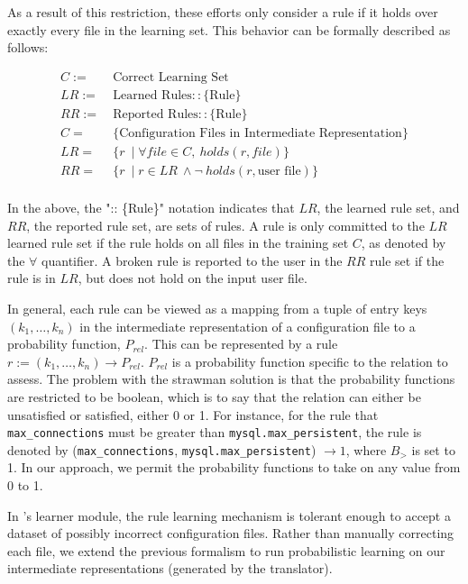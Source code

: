 As a result of this restriction, 
these efforts only consider a rule if it holds over exactly every file in 
the learning set. This behavior can be formally described as follows:
\begin{small}
\begin{align*}
C :=&\ \text{Correct Learning Set}\\
LR :=&\ \text{Learned Rules} :: \{\textrm{Rule}\}\\
RR :=&\ \text{Reported Rules} :: \{\textrm{Rule}\}\\ 
C =&\ \text{\{Configuration Files in Intermediate Representation\}}\\
LR =&\ \{ r\ \mid \forall file \in C,\ holds(r,file)\} \\
RR =&\ \{ r\ \mid r \in LR \ \land \neg\ holds(r,\textrm{user file}) \}\\
\end{align*}
\end{small}
In the above, the ":: \{Rule\}" notation indicates that $LR$, the learned rule set, 
and $RR$, the reported rule set, are sets of rules.
A rule is only committed to the $LR$ learned rule set if 
the rule holds on all files in the training set $C$, as denoted by the $\forall$ quantifier. 
A broken rule is reported to the user in the $RR$ rule set if the rule is in $LR$, 
but does not hold on the input user file.

In general, each rule can be viewed as a mapping from a tuple of 
entry keys $(k_1, \ldots, k_n)$ in the intermediate representation of a 
configuration file to a probability function, $P_{rel}$. This can be represented by a rule
$r := (k_1, \ldots, k_n) \rightarrow P_{rel}$.
$P_{rel}$ is a probability function specific to the relation to assess.
The problem with the strawman solution is that the probability functions are restricted to be 
boolean, which is to say that the relation can either be unsatisfied or satisfied, either 0 or 1. 
For instance, for the rule that {\tt max\_connections} must 
be greater than {\tt mysql.max\_persistent}, the rule is denoted by
({\tt max\_connections}, {\tt mysql.max\_persistent}) $\to 1$, where 
$B_{>}$ is set to 1. In our approach, we permit the probability functions to take on any value from 0 to 1.

In \app's learner module, the rule learning mechanism is tolerant 
enough to accept a dataset of possibly incorrect configuration files. 
Rather than manually correcting each file, 
we extend the previous formalism to run probabilistic learning
on our intermediate representations (generated by the translator). 

